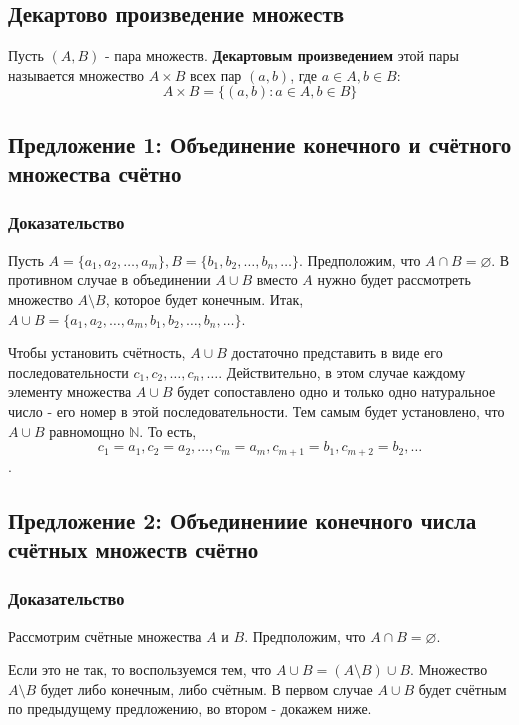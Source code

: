 \documentclass{article}
\begin{document}
\subsection{Декартово произведение множеств}

Пусть $(A, B)$ - пара множеств. \textbf{Декартовым произведением} этой пары называется множество $A \times B$ всех пар $(a, b)$, где $a \in A, b \in B$: \[
	A \times B = \{(a, b):a \in A, b \in B\}
\]

\subsection{Предложение 1: Объединение конечного и счётного множества счётно}
\subsubsection*{Доказательство}
Пусть $A = \{a_1, a_2, \dots, a_m\}, B = \{b_1, b_2, \dots, b_n, \dots\}$. Предположим, что $A \cap B = \varnothing$. В противном случае в объединении $A \cup B$ вместо $A$ нужно будет рассмотреть множество $A \setminus B$, которое будет конечным. Итак, $A \cup B = \{a_1, a_2, \dots, a_m, b_1, b_2, \dots, b_n, \dots\}$.

Чтобы установить счётность, $A \cup B$ достаточно представить в виде его последовательности $c_1, c_2, \dots, c_n, \dots$. Действительно, в этом случае каждому элементу множества $A \cup B$ будет сопоставлено одно и только одно натуральное число - его номер в этой последовательности. Тем самым будет установлено, что $A \cup B$ равномощно $\mathbb{N}$. То есть, \[c_1 = a_1, c_2 = a_2, \dots, c_m = a_m, c_{m+1} = b_1, c_{m+2} = b_2, \dots\].


\subsection{Предложение 2: Объединениие конечного числа счётных множеств счётно}
\subsubsection*{Доказательство}

Рассмотрим счётные множества $A$ и $B$. Предположим, что $A \cap B = \varnothing$.

Если это не так, то воспользуемся тем, что $A \cup B = (A \setminus B) \cup B$. Множество $A \setminus B$ будет либо конечным, либо счётным. В первом случае $A \cup B$ будет счётным по предыдущему предложению, во втором - докажем ниже.
\end{document}

